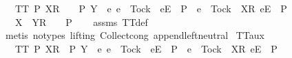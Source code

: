 \begin{isabellebody}
\ \ \ {\isachardoublequoteopen}TT{}\ P{\isachardoublequoteclose}\ {\isachardoublequoteopen}{\isacharbrackleft}{\isacharbrackleft}X{\isacharbrackright}\isactrlsub R{\isacharbrackright}\ {\isacharat}\ {\isasymsigma}\ {\isasymin}\ P{\isachardoublequoteclose}\ {\isachardoublequoteopen}Y\ {\isasyminter}\ {\isacharbraceleft}e{\isachardot}\ {\isacharparenleft}e\ {\isasymnoteq}\ Tock\ {\isasymand}\ {\isacharbrackleft}{\isacharbrackleft}e{\isacharbrackright}\isactrlsub E{\isacharbrackright}\ {\isasymin}\ P{\isacharparenright}\ {\isasymor}\ {\isacharparenleft}e\ {\isacharequal}\ Tock\ {\isasymand}\ {\isacharbrackleft}{\isacharbrackleft}X{\isacharbrackright}\isactrlsub R{\isacharcomma}\ {\isacharbrackleft}e{\isacharbrackright}\isactrlsub E{\isacharbrackright}\ {\isasymin}\ P{\isacharparenright}\ {\isacharbraceright}\ {\isacharequal}\ {\isacharbraceleft}{\isacharbraceright}{\isachardoublequoteclose}\isanewline
\ \ \ {\isachardoublequoteopen}{\isacharbrackleft}{\isacharbrackleft}X\ {\isasymunion}\ Y{\isacharbrackright}\isactrlsub R{\isacharbrackright}\ {\isacharat}\ {\isasymsigma}\ {\isasymin}\ P{\isachardoublequoteclose}\isanewline
%
\isadelimproof
\ \ %
\endisadelimproof
%
\isatagproof
{}\isamarkupfalse%
\ assms\ TT{}{\isacharunderscore}def\ \isamarkupfalse%
\ {\isacharparenleft}metis\ {\isacharparenleft}no{\isacharunderscore}types{\isacharcomma}\ lifting{\isacharparenright}\ Collect{\isacharunderscore}cong\ append{\isachardot}left{\isacharunderscore}neutral{\isacharparenright}%
\endisatagproof
{\isafoldproof}%
%
\isadelimproof
\isanewline
%
\endisadelimproof
\isanewline
{}\isamarkupfalse%
\ TT{}{\isacharunderscore}aux{}{\isacharcolon}\isanewline
\ \ \ {\isachardoublequoteopen}TT{}\ P{\isachardoublequoteclose}\ {\isachardoublequoteopen}{\isacharbrackleft}{\isacharbrackleft}X{\isacharbrackright}\isactrlsub R{\isacharbrackright}\ {\isasymin}\ P{\isachardoublequoteclose}\ {\isachardoublequoteopen}Y\ {\isasyminter}\ {\isacharbraceleft}e{\isachardot}\ {\isacharparenleft}e\ {\isasymnoteq}\ Tock\ {\isasymand}\ {\isacharbrackleft}{\isacharbrackleft}e{\isacharbrackright}\isactrlsub E{\isacharbrackright}\ {\isasymin}\ P{\isacharparenright}\ {\isasymor}\ {\isacharparenleft}e\ {\isacharequal}\ Tock\ {\isasymand}\ {\isacharbrackleft}{\isacharbrackleft}X{\isacharbrackright}\isactrlsub R{\isacharcomma}\ {\isacharbrackleft}e{\isacharbrackright}\isactrlsub E{\isacharbrackright}\ {\isasymin}\ P{\isacharparenright}\ {\isacharbraceright}\ {\isacharequal}\ {\isacharbraceleft}{\isacharbraceright}{\isachardoublequoteclose}\isanewline

\end{isabellebody}
